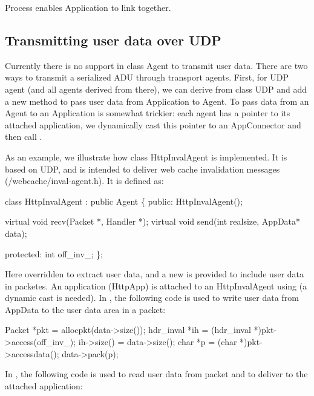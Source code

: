 Process enables Application to link together. 

\subsection{Transmitting user data over UDP}

Currently there is no support in class Agent to transmit user
data. There are two ways to transmit a serialized ADU through transport
agents. First, for UDP agent (and all agents derived from there), we
can derive from class UDP and add a new method
 to pass user data from
Application to Agent. To pass data from an Agent to an Application is
somewhat trickier: each agent has a pointer to its attached
application, we dynamically cast this pointer to an AppConnector and
then call .

As an example, we illustrate how class HttpInvalAgent is
implemented. It is based on UDP, and is intended to deliver web cache
invalidation messages (\ns/webcache/inval-agent.h). It is defined as:

\begin{program}
        class HttpInvalAgent : public Agent \{
        public: 
                HttpInvalAgent();

                virtual void recv(Packet *, Handler *);
                virtual void send(int realsize, AppData* data);

        protected:
                int off_inv_;
        \};
\end{program}

Here  overridden to extract user data,
and a new  is provided to include user data
in packetes. An application (HttpApp) is attached to an HttpInvalAgent
using  (a dynamic cast is needed). In
, the following code is used to write user data from
AppData to the user data area in a packet:

\begin{program}
        Packet *pkt = allocpkt(data->size());
        hdr_inval *ih = (hdr_inval *)pkt->access(off_inv_);
        ih->size() = data->size();
        char *p = (char *)pkt->accessdata();
        data->pack(p);
\end{program}

In , the following code is used to read user data from
packet and to deliver to the attached application:

